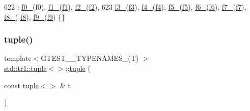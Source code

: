 \begin{DoxyCode}
622                                                   : \hyperlink{classstd_1_1tr1_1_1tuple_a771b1d99e8800fb284acd04bca838cbb}{f0\_}(f0), \hyperlink{classstd_1_1tr1_1_1tuple_a7cccf899dedc626c51fa4f6921d0ac52}{f1\_}(\hyperlink{namespacestd_1_1tr1_a9c0fa65b105f8e2f58ba59ecf75fd000}{f1}), 
      \hyperlink{classstd_1_1tr1_1_1tuple_aaec06c27366502dc332ef96878628f84}{f2\_}(\hyperlink{namespacestd_1_1tr1_a87dd9e009868361317f587126dba63d4}{f2}),
623       \hyperlink{classstd_1_1tr1_1_1tuple_ad4d3673e0d5c07c392c02e335fe978ff}{f3\_}(\hyperlink{namespacestd_1_1tr1_a0f7c3b47d27d42d82d1a333ea420ce4e}{f3}), \hyperlink{classstd_1_1tr1_1_1tuple_ab662f1051c2302d065796383848db6c4}{f4\_}(\hyperlink{namespacestd_1_1tr1_adc796e02b7385d526aff708189564f67}{f4}), \hyperlink{classstd_1_1tr1_1_1tuple_a32d8cd6f180c0a77d83733fc65423657}{f5\_}(\hyperlink{namespacestd_1_1tr1_a9c1eb66b2b2fa321942af95405232a0d}{f5}), \hyperlink{classstd_1_1tr1_1_1tuple_a597beab3af3f95c84408491ab14632b0}{f6\_}(\hyperlink{namespacestd_1_1tr1_a6b62f32e1e3e21bceb94eb46c4cbfd56}{f6}), \hyperlink{classstd_1_1tr1_1_1tuple_a7c28780e616d382833e844f62672c6bc}{f7\_}(\hyperlink{namespacestd_1_1tr1_a2185f3a1c07f2df072c39cb91ffa89a4}{f7}), \hyperlink{classstd_1_1tr1_1_1tuple_ae859012c83943e54e035a4a32089ccb6}{f8\_}(
      \hyperlink{namespacestd_1_1tr1_ab998afa41cea8d6d26d7e4288b0bf974}{f8}), \hyperlink{classstd_1_1tr1_1_1tuple_a336d5e582fd34e45ec88c78d473671dd}{f9\_}(\hyperlink{namespacestd_1_1tr1_a216d2c7cdfaaf415caba2f88e2c34413}{f9}) \{\}
\end{DoxyCode}
\mbox{\label{classstd_1_1tr1_1_1tuple_ade1807f6e6b36daa6387c3b00dbd3be6}} 
\subsubsection{\texorpdfstring{tuple()}{tuple()}\hspace{0.1cm}{\footnotesize\ttfamily [3/4]}}
{\footnotesize\ttfamily template$<$G\+T\+E\+S\+T\+\_\+\_\+\+T\+Y\+P\+E\+N\+A\+M\+E\+S\+\_\+(\+T) $>$ \\
\hyperlink{classstd_1_1tr1_1_1tuple}{std\+::tr1\+::tuple}$<$$>$\+::\hyperlink{classstd_1_1tr1_1_1tuple}{tuple} (\begin{DoxyParamCaption}\item[{const \hyperlink{classstd_1_1tr1_1_1tuple}{tuple}$<$$>$ \&}]{t }\end{DoxyParamCaption})\hspace{0.3cm}{\ttfamily [inline]}}



